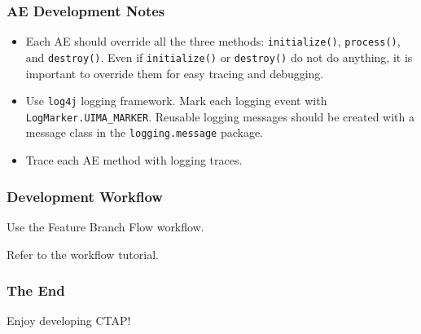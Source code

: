 \documentclass{beamer}
\begin{document}
\begin{frame}
\frametitle{AE Development Notes}
\begin{itemize}
	\item Each AE should override all the three methods: \texttt{initialize()},
	\texttt{process()}, and \texttt{destroy()}. Even if \texttt{initialize()} or
	\texttt{destroy()} do not do anything, it is important to override them for
	easy tracing and debugging.  
	\item Use \texttt{log4j} logging framework. Mark each logging event with
	\texttt{LogMarker.UIMA\_MARKER}. Reusable logging messages should be created
	with a message class in the \texttt{logging.message} package.
	\item Trace each AE method with logging traces.
\end{itemize}
\end{frame}

\begin{frame}
\frametitle{Development Workflow}
	Use the Feature Branch Flow workflow. 
	
	Refer to the workflow tutorial.
\end{frame}

\begin{frame}
\frametitle{The End}
	Enjoy developing CTAP!
\end{frame}
\end{document}
